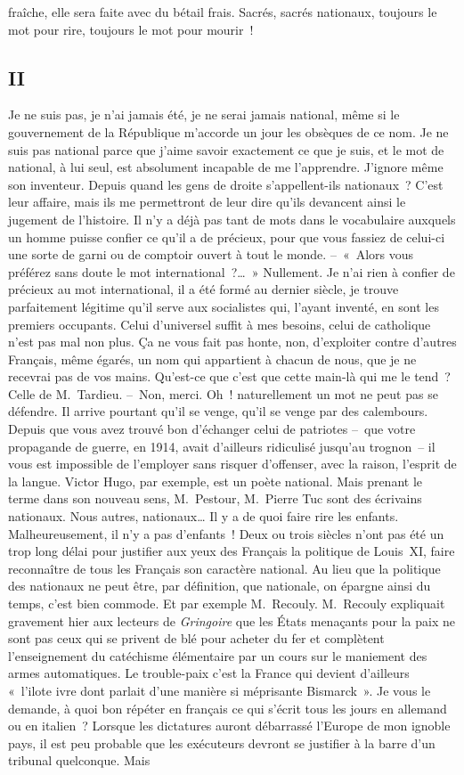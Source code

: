 \documentclass[french,twoside]{book} %
\begin{document}
fraîche, elle sera faite avec du bétail frais. Sacrés, sacrés nationaux, toujours le mot pour rire, toujours le mot pour mourir !
\subsection[{II}]{II}
\noindent Je ne suis pas, je n’ai jamais été, je ne serai jamais national, même si le gouvernement de la République m’accorde un jour les obsèques de ce nom. Je ne suis pas national parce que j’aime savoir exactement ce que je suis, et le mot de national, à lui seul, est absolument incapable de me l’apprendre. J’ignore même son inventeur. Depuis quand les gens de droite s’appellent-ils nationaux ? C’est leur affaire, mais ils me permettront de leur dire qu’ils devancent ainsi le jugement de l’histoire. Il n’y a déjà pas tant de mots dans le vocabulaire auxquels un homme puisse confier ce qu’il a de précieux, pour que vous fassiez de celui-ci une sorte de garni ou de comptoir ouvert à tout le monde. – « Alors vous préférez sans doute le mot international ?… » Nullement. Je n’ai rien à confier de précieux au mot international, il a été formé au dernier siècle, je trouve parfaitement légitime qu’il serve aux socialistes qui, l’ayant inventé, en sont les premiers occupants. Celui d’universel suffit à mes besoins, celui de catholique n’est pas mal non plus. Ça ne vous fait pas honte, non, d’exploiter contre d’autres Français, même égarés, un nom qui appartient à chacun de nous, que je ne recevrai pas de vos mains. Qu’est-ce que c’est que cette main-là qui me le tend ? Celle de M. Tardieu. – Non, merci. Oh ! naturellement un mot ne peut pas se défendre. Il arrive pourtant qu’il se venge, qu’il se venge par des calembours. Depuis que vous avez trouvé bon d’échanger celui de patriotes – que votre propagande de guerre, en 1914, avait d’ailleurs ridiculisé jusqu’au trognon – il vous est impossible de l’employer sans risquer d’offenser, avec la raison, l’esprit de la langue. Victor Hugo, par exemple, est un poète national. Mais prenant le terme dans son nouveau sens, M. Pestour, M. Pierre Tuc sont des écrivains nationaux. Nous autres, nationaux… Il y a de quoi faire rire les enfants. Malheureusement, il n’y a pas d’enfants ! Deux ou trois siècles n’ont pas été un trop long délai pour justifier aux yeux des Français la politique de Louis \textsc{XI}, faire reconnaître de tous les Français son caractère national. Au lieu que la politique des nationaux ne peut être, par définition, que nationale, on épargne ainsi du temps, c’est bien commode. Et par exemple M. Recouly. M. Recouly expliquait gravement hier aux lecteurs de \emph{Gringoire} que les États menaçants pour la paix ne sont pas ceux qui se privent de blé pour acheter du fer et complètent l’enseignement du catéchisme élémentaire par un cours sur le maniement des armes automatiques. Le trouble-paix c’est la France qui devient d’ailleurs « l’ilote ivre dont parlait d’une manière si méprisante Bismarck ». Je vous le demande, à quoi bon répéter en français ce qui s’écrit tous les jours en allemand ou en italien ? Lorsque les dictatures auront débarrassé l’Europe de mon ignoble pays, il est peu probable que les exécuteurs devront se justifier à la barre d’un tribunal quelconque. Mais 
\end{document}
